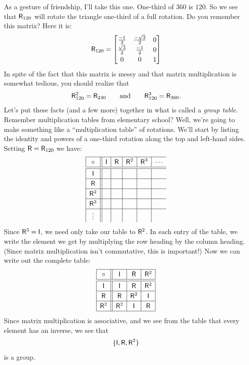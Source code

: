 As a gesture of friendship, I'll take this one. One-third of $360$ is
$120$. So we see that $\mathsf{R}_{120}$ will rotate the triangle one-third
of a full rotation. Do you remember this matrix? Here it is:
\[
\mat{R}_{120} =
\begin{bmatrix}
\frac{-1}{2} & \frac{-\sqrt{3}}{2} & 0\\
\frac{\sqrt{3}}{2} & \frac{-1}{2} & 0\\
0 & 0 & 1
\end{bmatrix}
\]
In spite of the fact that this matrix is messy and that matrix
multiplication is somewhat tedious, you should realize that
\[
\mathsf{R}_{120}^2 = \mathsf{R}_{240}\qquad\text{and}\qquad\mathsf{R}_{120}^3 = \mathsf{R}_{360}.
\]
Let's put these facts (and a few more) together in what is called a
\textit{group table}. Remember multiplication
tables from elementary school? Well, we're going to make something
like a ``multiplication table'' of rotations. We'll start by listing
the identity and powers of a one-third rotation along the top and
left-hand sides. Setting $\mathsf{R} = \mathsf{R}_{120}$ we have:
\[
{
\renewcommand{\arraystretch}{1.2}
\begin{array}{|c||c|c|c|c|c}
\hline 
\circ & \mat{I} & \mat{R} & \mat{R}^2 & \mat{R}^3 & \cdots \\ \hline\hline 
\mat{I} & & & & &  \\ \hline 
\mat{R} & & & & &  \\ \hline 
\mat{R}^2 &  & & & & \\ \hline
\mat{R}^3 &  & & & & \\ \hline
\vdots &  & & & & \\ 
\end{array}}
\]
Since $\mathsf{R}^3 = \mathsf{I}$, we need only take our table to
$\mathsf{R}^2$. In each entry of the table, we write the element we get by multiplying the row heading by the column heading.  (Since matrix multiplication isn't commutative, this is important!)  Now we can write out the complete table:
\[
{
\renewcommand{\arraystretch}{1.2}
\begin{array}{| c || c | c | c |}
\hline 
\circ & \mat{I} & \mat{R} & \mat{R}^2 \\ \hline\hline 
\mat{I} & \mat{I} & \mat{R} & \mat{R}^2 \\ \hline 
\mat{R} & \mat{R} & \mat{R}^2 & \mat{I} \\ \hline 
\mat{R}^2 & \mat{R}^2 & \mat{I} & \mat{R} \\ \hline
\end{array}}
\]
Since matrix multiplication is associative, and we see from the table
that every element has an inverse, we see that 
\[
\{\mathsf{I}, \mathsf{R}, \mathsf{R}^2\}
\]
is a group.

